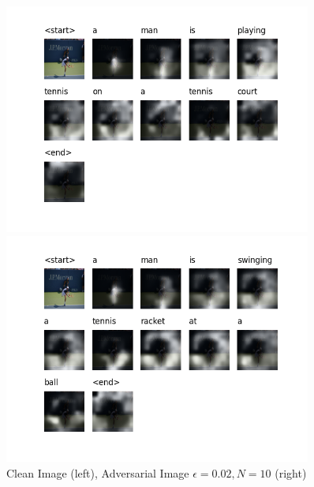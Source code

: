 \begin{figure}[h]
    \centering
    \begin{minipage}{0.45\textwidth}
        \centering
        \includegraphics[width=0.9\textwidth]{figures/caption_clean_tennis_court.png} %
    \end{minipage}\hfill
    \begin{minipage}{0.45\textwidth}
        \centering
        \includegraphics[width=0.9\textwidth]{figures/caption_adv_tennis_court_0.02.png} %
    \end{minipage}
    \caption{Clean Image (left), Adversarial Image $\epsilon=0.02, N=10$ (right)}
    \label{adv_example_caption_tennis}
\end{figure}

